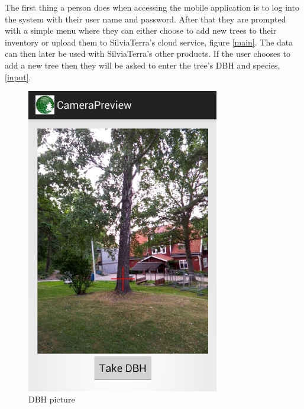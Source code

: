 The first thing a person does when accessing the mobile application is to log into the system with their user name and password. After that they are prompted with a simple menu where they can either choose to add new trees to their inventory or upload them to SilviaTerra's cloud service, figure \ref{main}. The data can then later be used with SilviaTerra's other products. If the user chooses to add a new tree then they will be asked to enter the tree's DBH and species, \ref{input}. 
\begin{figure}[!htb]
		\centering
  		\includegraphics[width=0.75\textwidth]{dbh.png}
	  	\caption{DBH picture}
	  	\label{dbh}
	\endminipage\hfill
		\centering

\end{figure}
